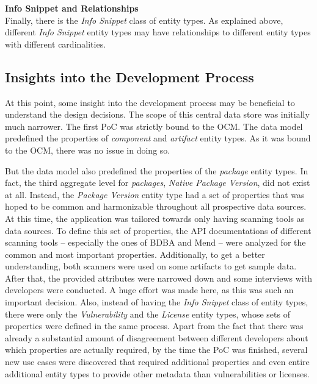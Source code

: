 \noindent\textbf{Info Snippet and Relationships}\\
Finally, there is the \emph{Info Snippet} class of entity types. As explained above, different \emph{Info Snippet} entity types may have relationships to different entity types with different cardinalities.

\subsection{Insights into the Development Process} \label{sec:Insights into the Development Process}
At this point, some insight into the development process may be beneficial to understand the design decisions. The scope of this central data store was initially much narrower. The first PoC was strictly bound to the OCM. The data model predefined the properties of \emph{component} and \emph{artifact} entity types. As it was bound to the OCM, there was no issue in doing so.\par
But the data model also predefined the properties of the \emph{package} entity types. In fact, the third aggregate level for \emph{packages}, \emph{Native Package Version}, did not exist at all. Instead, the \emph{Package Version} entity type had a set of properties that was hoped to be common and harmonizable throughout all prospective data sources. At this time, the application was tailored towards only having scanning tools as data sources. To define this set of properties, the API documentations of different scanning tools -- especially the ones of BDBA and Mend \cite{MendAPI} -- were analyzed for the common and most important properties. Additionally, to get a better understanding, both scanners were used on some artifacts to get sample data. After that, the provided attributes were narrowed down and some interviews with developers were conducted. A huge effort was made here, as this was such an important decision. Also, instead of having the \emph{Info Snippet} class of entity types, there were only the \emph{Vulnerability} and the \emph{License} entity types, whose sets of properties were defined in the same process. Apart from the fact that there was already a substantial amount of disagreement between different developers about which properties are actually required, by the time the PoC was finished, several new use cases were discovered that required additional properties and even entire additional entity types to provide other metadata than vulnerabilities or licenses.\par
